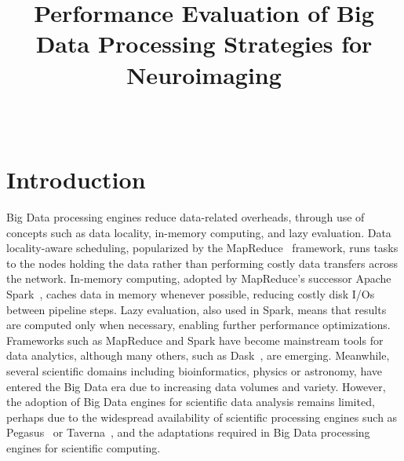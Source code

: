 \documentclass{IEEEtran}
\begin{document}
\title{Performance Evaluation of Big Data Processing Strategies for Neuroimaging}

\author{
  \\
}

\maketitle

\begin{abstract}
  
\end{abstract}


\section{Introduction} %

Big Data processing engines reduce data-related overheads, through 
use of concepts such as data locality, in-memory computing, and lazy evaluation.
Data locality-aware scheduling, popularized by the MapReduce~\cite{dean2008mapreduce} 
framework, runs tasks to the nodes holding the data rather than 
performing costly data transfers across the network. In-memory 
computing, adopted by MapReduce's successor Apache 
Spark~\cite{zaharia2016apache}, caches data in memory whenever 
possible, reducing costly disk I/Os between pipeline steps. 
Lazy evaluation, also used in Spark, means that results are computed only 
when necessary, enabling further performance optimizations. Frameworks 
such as
MapReduce and Spark have become mainstream tools for data analytics, 
although many others, such as 
Dask~\cite{rocklin2015dask}, are emerging. 
Meanwhile, several scientific 
domains including bioinformatics, physics or astronomy, have entered 
the Big Data era due to increasing data volumes and variety. 
However, the adoption of Big Data engines for scientific data analysis 
remains limited, perhaps due to the widespread availability of 
scientific processing engines such as Pegasus~\cite{deelman2005pegasus} or
Taverna~\cite{oinn2004taverna}, and the adaptations required in Big 
Data processing engines for scientific computing. 
\end{document}

